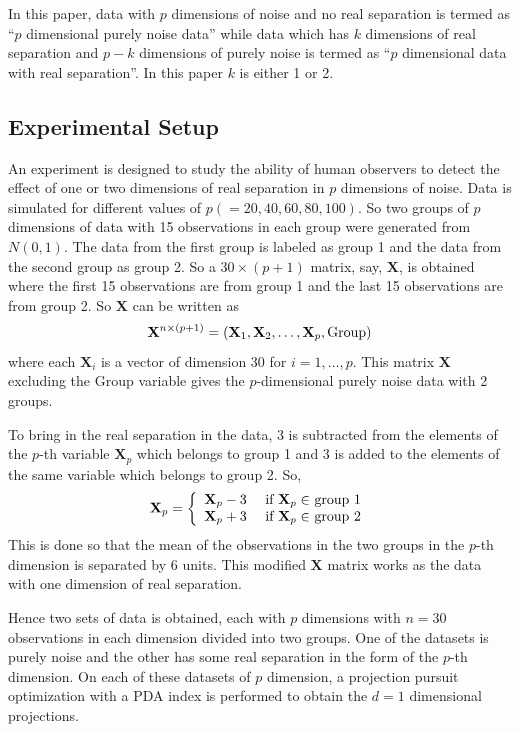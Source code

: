 
In this paper, data with $p$ dimensions of noise and no real separation is termed as ``$p$ dimensional purely noise data'' while data which has $k$ dimensions of real separation and $p - k$ dimensions of purely noise is termed as ``$p$ dimensional data with real separation''. In this paper $k$ is either 1 or 2. 

\subsection{Experimental Setup} \label{sec:experiment}


An experiment is designed to study the ability of human observers to detect the effect of one or two dimensions of real separation in $p$ dimensions of noise. Data is simulated for different values of $p  ( = 20, 40, 60, 80, 100)$.  So two groups of $p$ dimensions of data with 15 observations in each group were generated from $N(0, 1)$.  The data from the first group is labeled as group 1 and the data from the second group as group 2. So a $30 \times (p + 1)$ matrix, say, $\mathbf{X}$, is obtained where the first 15 observations are from group 1 and the last 15 observations are from group 2.  So $\mathbf{X}$ can be written as
$$\mathbf{X}^{n \times (p + 1)} = (\mathbf{X}_1, \mathbf{X}_2, \dots, \mathbf{X}_p, \hbox{Group})$$ where each $\mathbf{X}_i$ is a vector of dimension 30 for $i = 1, \dots, p$. This matrix $\mathbf{X}$ excluding the Group variable gives the $p$-dimensional purely noise data with 2 groups.

To bring in the real separation in the data, 3 is subtracted from the elements of the $p$-th variable $\mathbf{X}_p$ which belongs to group 1 and 3 is added to the elements of the same variable which belongs to group 2. So, 
$$
\mathbf{X}_p = \left\{ \begin{array}{rl}
 \mathbf{X}_p - 3 &\mbox{ if $ \mathbf{X}_p \in$ group 1} \\
 \mathbf{X}_p + 3 &\mbox{ if $ \mathbf{X}_p \in$ group 2}
       \end{array} \right.
$$
This is done so that the mean of the observations in the two groups in the $p$-th dimension is separated by 6 units. This modified $ \mathbf{X}$ matrix works as the data with one dimension of real separation. 

Hence two sets of data is obtained, each with $p$ dimensions with $n = 30$ observations in each dimension divided into two groups. One of the datasets is purely noise and the other has some real separation in the form of the $p$-th dimension. On each of these datasets of $p$ dimension, a projection pursuit optimization with a PDA index is performed to obtain the $d = 1$ dimensional projections.  

